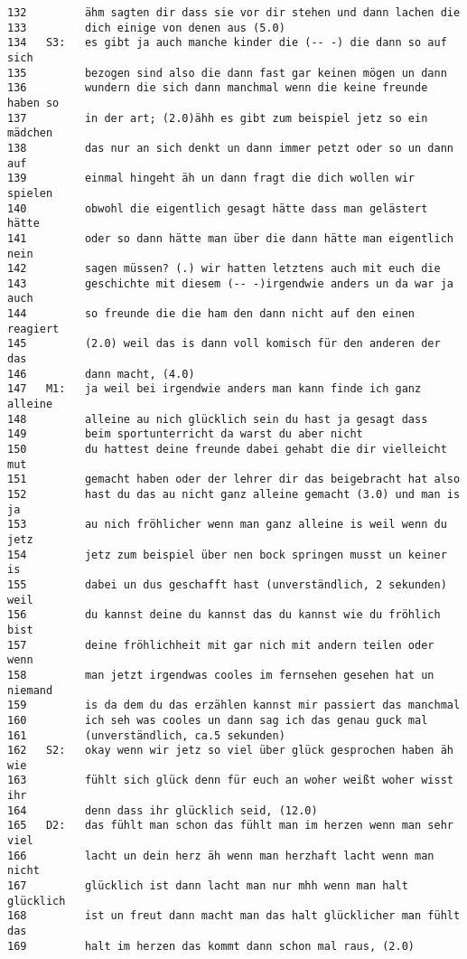 \begin{lstlisting}[language={}]
132         ähm sagten dir dass sie vor dir stehen und dann lachen die 
133         dich einige von denen aus (5.0)
134   S3:   es gibt ja auch manche kinder die (-- -) die dann so auf sich 
135         bezogen sind also die dann fast gar keinen mögen un dann 
136         wundern die sich dann manchmal wenn die keine freunde haben so  
137         in der art; (2.0)ähh es gibt zum beispiel jetz so ein mädchen 
138         das nur an sich denkt un dann immer petzt oder so un dann auf 
139         einmal hingeht äh un dann fragt die dich wollen wir spielen 
140         obwohl die eigentlich gesagt hätte dass man gelästert hätte 
141         oder so dann hätte man über die dann hätte man eigentlich nein 
142         sagen müssen? (.) wir hatten letztens auch mit euch die  
143         geschichte mit diesem (-- -)irgendwie anders un da war ja auch 
144         so freunde die die ham den dann nicht auf den einen reagiert  
145         (2.0) weil das is dann voll komisch für den anderen der das 
146         dann macht, (4.0)
147   M1:   ja weil bei irgendwie anders man kann finde ich ganz alleine 
148         alleine au nich glücklich sein du hast ja gesagt dass
149         beim sportunterricht da warst du aber nicht
150         du hattest deine freunde dabei gehabt die dir vielleicht mut 
151         gemacht haben oder der lehrer dir das beigebracht hat also 
152         hast du das au nicht ganz alleine gemacht (3.0) und man is ja 
153         au nich fröhlicher wenn man ganz alleine is weil wenn du jetz 
154         jetz zum beispiel über nen bock springen musst un keiner is 
155         dabei un dus geschafft hast (unverständlich, 2 sekunden) weil 
156         du kannst deine du kannst das du kannst wie du fröhlich bist 
157         deine fröhlichheit mit gar nich mit andern teilen oder wenn 
158         man jetzt irgendwas cooles im fernsehen gesehen hat un niemand 
159         is da dem du das erzählen kannst mir passiert das manchmal 
160         ich seh was cooles un dann sag ich das genau guck mal  
161         (unverständlich, ca.5 sekunden)
162   S2:   okay wenn wir jetz so viel über glück gesprochen haben äh wie  
163         fühlt sich glück denn für euch an woher weißt woher wisst ihr 
164         denn dass ihr glücklich seid, (12.0)
165   D2:   das fühlt man schon das fühlt man im herzen wenn man sehr viel 
166         lacht un dein herz äh wenn man herzhaft lacht wenn man nicht 
167         glücklich ist dann lacht man nur mhh wenn man halt glücklich 
168         ist un freut dann macht man das halt glücklicher man fühlt das 
169         halt im herzen das kommt dann schon mal raus, (2.0)

\end{lstlisting}
